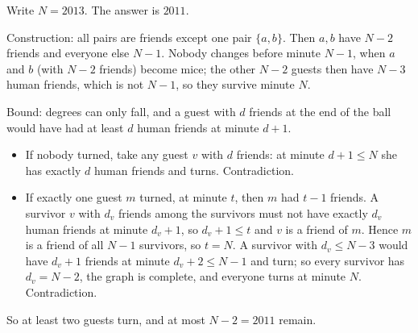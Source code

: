 Write $N=2013$. The answer is $\boxed{2011}$.

Construction: all pairs are friends except one pair $\{a,b\}$. Then $a,b$ have $N-2$ friends and everyone else $N-1$. Nobody changes before minute $N-1$, when $a$ and $b$ (with $N-2$ friends) become mice; the other $N-2$ guests then have $N-3$ human friends, which is not $N-1$, so they survive minute $N$.

Bound: degrees can only fall, and a guest with $d$ friends at the end of the ball would have had at least $d$ human friends at minute $d+1$.
\begin{itemize}
\item If nobody turned, take any guest $v$ with $d$ friends: at minute $d+1\le N$ she has exactly $d$ human friends and turns. Contradiction.
\item If exactly one guest $m$ turned, at minute $t$, then $m$ had $t-1$ friends. A survivor $v$ with $d_v$ friends among the survivors must not have exactly $d_v$ human friends at minute $d_v+1$, so $d_v+1\le t$ and $v$ is a friend of $m$. Hence $m$ is a friend of all $N-1$ survivors, so $t=N$. A survivor with $d_v\le N-3$ would have $d_v+1$ friends at minute $d_v+2\le N-1$ and turn; so every survivor has $d_v=N-2$, the graph is complete, and everyone turns at minute $N$. Contradiction.
\end{itemize}
So at least two guests turn, and at most $N-2=2011$ remain.
